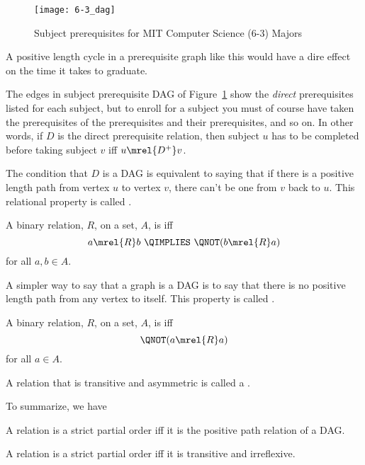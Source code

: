 \begin{figure}

\texttt{[image: 6-3\_dag]}

\caption{Subject prerequisites for MIT Computer Science (6-3) Majors}

\label{6-3_subjects}

\end{figure}

A positive length cycle in a prerequisite graph like this would have a
dire effect on the time it takes to graduate.

The edges in subject prerequisite DAG of Figure~\ref{6-3_subjects} show the
\emph{direct} prerequisites listed for each subject, but to enroll for
a subject you must of course have taken the prerequisites of the
prerequisites and their prerequisites, and so on.  In other words, if
$D$ is the direct prerequisite relation, then subject $u$ has to be
completed before taking subject $v$ iff $u \mrel{D^+} v$.

The condition that $D$ is a DAG is equivalent to saying that if there
is a positive length path from vertex $u$ to vertex $v$, there can't
be one from $v$ back to $u$.  This relational property is called
.

\begin{definition}
A binary relation, $R$, on a set, $A$, is
 iff
\[
a \mrel{R} b\ \QIMPLIES\ \QNOT(b \mrel{R} a)
\]
for all $a,b\in A$.
\end{definition}

A simpler way to say that a graph is a DAG is to say that there is no
positive length path from any vertex to itself.  This property is
called .

\begin{definition}
A binary relation, $R$, on a set, $A$, is
 iff
\[
\QNOT(a \mrel{R} a)
\]
for all $a \in A$.
\end{definition}

\begin{definition}
A relation that is transitive and asymmetric is called a .
\end{definition}

To summarize, we have
\begin{theorem}
A relation is a strict partial order iff it is the positive path relation of a DAG.
\end{theorem}

\begin{corollary}
A relation is a strict partial order iff it is transitive and
irreflexive.
\end{corollary}


